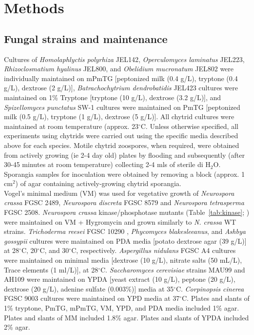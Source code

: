 \section{Methods}
\subsection*{Fungal strains and maintenance}
Cultures of \textit{Homolaphlyctis polyrhiza} JEL142, \textit{Operculomyces laminatus} JEL223, \textit{Rhizoclosmatium hyalinus} JEL800, and \textit{Obelidium mucronatum} JEL802 were individually maintained on mPmTG [peptonized milk (0.4 g/L), tryptone (0.4 g/L), dextrose (2 g/L)], \textit{Batrachochytrium dendrobatidis} JEL423 cultures were maintained on 1\% Tryptone [tryptone (10 g/L), dextrose (3.2 g/L)], and \textit{Spizellomyces punctatus} SW-1 cultures were maintained on PmTG [peptonized milk (0.5 g/L), tryptone (1 g/L), dextrose (5 g/L)]. All chytrid cultures were maintained at room temperature (approx. 23$^{\circ}$C. Unless otherwise specified, all experiments using chytrids were carried out using the specific media described above for each species. Motile chytrid zoospores, when required, were obtained from actively growing (ie 2-4 day old) plates by flooding and subsequently (after 30-45 minutes at room temperature) collecting 2-4 mls of sterile di H$_{2}$O. Sporangia samples for inoculation were obtained by removing a block (approx. 1 cm$^{2}$) of agar containing actively-growing chytrid sporangia.\\
\indent Vogel's minimal medium (VM) \cite{Davis1970} was used for vegetative growth of \textit{Neurospora crassa} FGSC 2489, \textit{Neurospora discreta} FGSC 8579 and \textit{Neurospora tetrasperma} FGSC 2508. \textit{Neurospora crassa} kinase/phosphotase mutants (Table~\ref{tab:kinase}; \cite{Park2011}) were maintained on VM + Hygromycin and grown similarly to \textit{N. crassa} WT strains. \textit{Trichoderma reesei} FGSC 10290 , \textit{Phycomyces blakesleeanus}, and \textit{Ashbya gossypii} cultures were maintained on PDA media [potato dextrose agar (39 g/L)] at 28$^{\circ}$C, 20$^{\circ}$C, and 30$^{\circ}$C, respectively. \textit{Aspergillus nidulans} FGSC A4 cultures were maintained on minimal media [dextrose (10 g/L), nitrate salts (50 mL/L), Trace elements (1 ml/L)], at 28$^{\circ}$C. \textit{Saccharomyces cerevisiae} strains MAU99 and AH109 were maintained on YPDA [yeast extract (10 g/L), peptone (20 g/L), dextrose (20 g/L), adenine sulfate (0.003\%)] media at 35$^{\circ}$C. \textit{Corpinopsis cinerea} FGSC 9003 cultures were maintained on YPD media at 37$^{\circ}$C.  Plates and slants of 1\% tryptone, PmTG, mPmTG, VM, YPD, and PDA media included 1\% agar. Plates and slants of MM included 1.8\% agar. Plates and slants of YPDA included 2\% agar.\\
